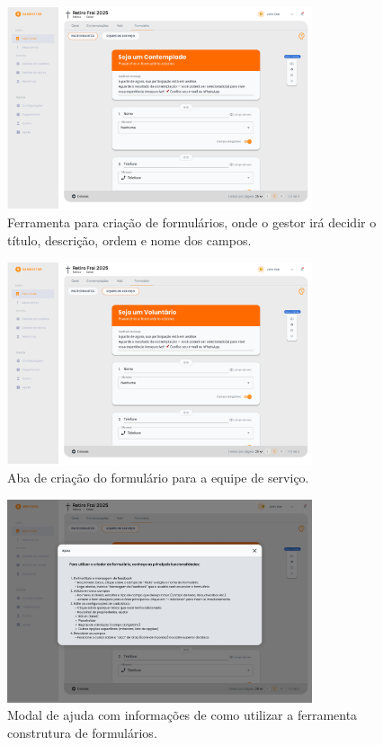 \begin{figure}[H]
\centering
\includegraphics[width=0.8\textwidth]{images/prototipacao/gestao_retiros_geral/Formulario.png}
\caption{Ferramenta para criação de formulários, onde o gestor irá decidir o título, descrição, ordem e nome dos campos.}
\end{figure}

\begin{figure}[H]
\centering
\includegraphics[width=0.8\textwidth]{images/prototipacao/gestao_retiros_geral/FormularioEquipeDeServico.png}
\caption{Aba de criação do formulário para a equipe de serviço.}
\end{figure}

\begin{figure}[H]
\centering
\includegraphics[width=0.8\textwidth]{images/prototipacao/gestao_retiros_geral/Ajuda.png}
\caption{Modal de ajuda com informações de como utilizar a ferramenta construtura de formulários.}
\end{figure}

